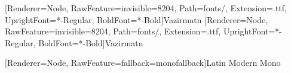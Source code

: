 [Renderer=Node, RawFeature={invisible=8204}, Path=fonts/, Extension=.ttf, UprightFont=*-Regular, BoldFont=*-Bold]{Vazirmatn}
[Renderer=Node, RawFeature={invisible=8204}, Path=fonts/, Extension=.ttf, UprightFont=*-Regular, BoldFont=*-Bold]{Vazirmatn}

\makeatletter
\def\zerowidthnonjoiner{%
  \texorpdfstring{%
    \TextOrMath{\nobreak\discretionary{-}{}{\char"200C\kern.03em}%
      \ifvmode\else\nobreak\hskip\z@skip\fi}{}%
  }{}%
}
\makeatother

[Renderer=Node, RawFeature={fallback=monofallback}]{Latin Modern Mono}

\usepackage{fvextra}

